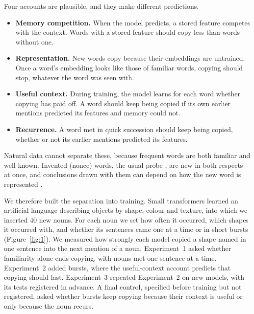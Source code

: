 \documentclass{article}
\begin{document}
Four accounts are plausible, and they make different predictions.
\begin{itemize}[leftmargin=*,itemsep=1pt,topsep=2pt]
\item \textbf{Memory competition.} When the model predicts, a stored feature competes with the context. Words with a stored feature should copy less than words without one.
\item \textbf{Representation.} New words copy because their embeddings are untrained. Once a word's embedding looks like those of familiar words, copying should stop, whatever the word was seen with.
\item \textbf{Useful context.} During training, the model learns for each word whether copying has paid off. A word should keep being copied if its own earlier mentions predicted its features and memory could not.
\item \textbf{Recurrence.} A word met in quick succession should keep being copied, whether or not its earlier mentions predicted its features.
\end{itemize}
Natural data cannot separate these, because frequent words are both familiar and well known. Invented (nonce) words, the usual probe \citep{thrush2020,misra2023}, are new in both respects at once, and conclusions drawn with them can depend on how the new word is represented \citep{kim2022lexical}.

We therefore built the separation into training. Small transformers learned an artificial language describing objects by shape, colour and texture, into which we inserted 40 new nouns. For each noun we set how often it occurred, which shapes it occurred with, and whether its sentences came one at a time or in short bursts (Figure~\ref{fig:1}). We measured how strongly each model copied a shape named in one sentence into the next mention of a noun. Experiment~1 asked whether familiarity alone ends copying, with nouns met one sentence at a time. Experiment~2 added bursts, where the useful-context account predicts that copying should last. Experiment~3 repeated Experiment~2 on new models, with its tests registered in advance. A final control, specified before training but not registered, asked whether bursts keep copying because their context is useful or only because the noun recurs.
\end{document}
